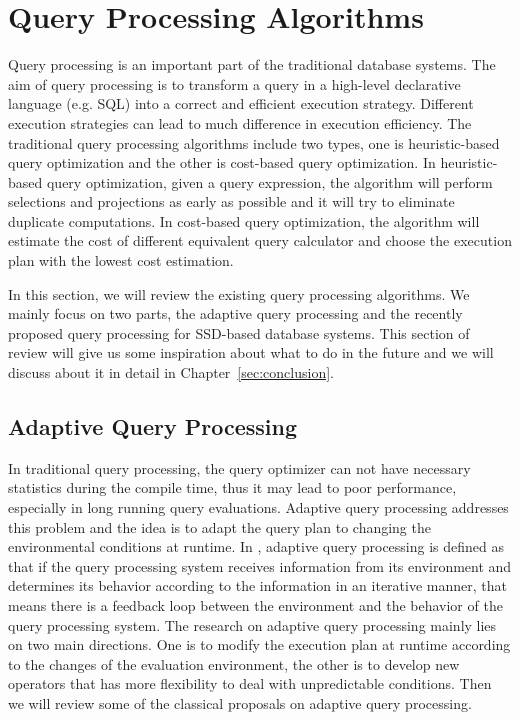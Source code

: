 \section{Query Processing Algorithms}
Query processing is an important part of the traditional database systems. The aim of query processing is to transform a query in a high-level declarative language (e.g. SQL) into a correct and efficient execution strategy. Different execution strategies can lead to much difference in execution efficiency. The traditional query processing algorithms include two types, one is heuristic-based query optimization and the other is cost-based query optimization. In heuristic-based query optimization, given a query expression, the algorithm will perform selections and projections as early as possible and it will try to eliminate duplicate computations. In cost-based query optimization, the algorithm will estimate the cost of different equivalent query calculator and choose the execution plan with the lowest cost estimation.

In this section, we will review the existing query processing algorithms. We mainly focus on two parts, the adaptive query processing and the recently proposed query processing for SSD-based database systems. This section of review will give us some inspiration about what to do in the future and we will discuss about it in detail in Chapter~\ref{sec:conclusion}.


\subsection{Adaptive Query Processing}
In traditional query processing, the query optimizer can not have necessary statistics during the compile time, thus it may lead to poor performance, especially in long running query evaluations. Adaptive query processing addresses this problem and the idea is to adapt the query plan to changing the environmental conditions at runtime. In \cite{hellerstein2000adaptive}, adaptive query processing is defined as that if the query processing system receives information from its environment and determines its behavior according to the information in an iterative manner, that means there is a feedback loop between the environment and the behavior of the query processing system. The research on adaptive query processing mainly lies on two main directions. One is to modify the execution plan at runtime according to the changes of the evaluation environment, the other is to develop new operators that has more flexibility to deal with unpredictable conditions. Then we will review some of the classical proposals on adaptive query processing.

